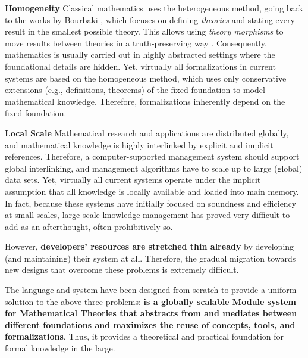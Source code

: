 {\bf Homogeneity}
Classical mathematics uses the heterogeneous method, going back to the works by Bourbaki \cite{bourbakiunivers}, which focuses on defining \emph{theories} and stating every result in the smallest possible theory.
This allows using \emph{theory morphisms} to move results between theories in a truth-preserving way \cite{littletheories}.
Consequently, mathematics is usually carried out in highly abstracted settings where the foundational details are hidden.
Yet, virtually all formalizations in current systems are based on the homogeneous method, which uses only conservative extensions (e.g., definitions, theorems) of the fixed foundation to model mathematical knowledge.
Therefore, formalizations inherently depend on the fixed foundation.

{\bf Local Scale} Mathematical research and applications are distributed globally, and mathematical knowledge is highly interlinked by explicit and implicit references.
Therefore, a computer-supported management system should support global interlinking, and management algorithms have to scale up to large (global) data sets.
Yet, virtually all current systems operate under the implicit assumption that all knowledge is locally available and loaded into main memory.
In fact, because these systems have initially focused on soundness and efficiency at small scales, large scale knowledge management has proved very difficult to add as an afterthought, often prohibitively so.
\medskip

However, \textbf{developers' resources are stretched thin already} by developing (and maintaining) their system at all.
Therefore, the gradual migration towards new designs that overcome these problems is extremely difficult.

The {\mmt} language and system have been designed from scratch to provide a uniform solution to the above three problems: \textbf{\mmt is a globally scalable Module system for Mathematical Theories that abstracts from and mediates between different foundations and maximizes the reuse of concepts, tools, and formalizations}.
Thus, it provides a theoretical and practical foundation for formal knowledge in the large.


